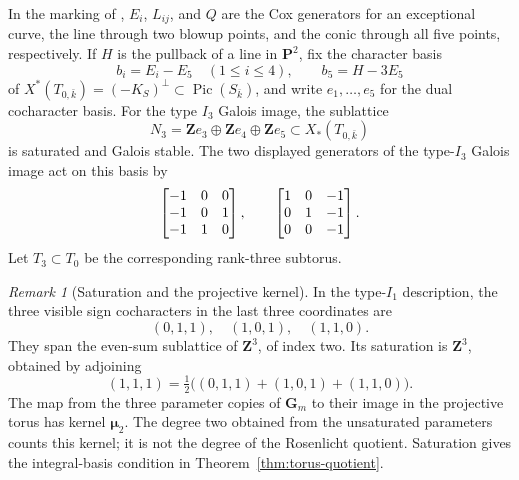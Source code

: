 \documentclass[11pt]{article}
\theoremstyle{remark}
\newtheorem{remark}[theorem]{Remark}
\newcommand{\Gm}{\mathbf G_m}
\newcommand{\PP}{\mathbf P}
\newcommand{\Z}{\mathbf Z}
\newcommand{\Pic}{\operatorname{Pic}}
\begin{document}
In the marking of \cite[Sections~3--4]{TZ}, \(E_i\), \(L_{ij}\), and \(Q\)
are the Cox generators for an exceptional curve, the line through two blowup
points, and the conic through all five points, respectively.  If \(H\)
is the pullback of a line in \(\PP^2\), fix the character basis
\[
 b_i=E_i-E_5\quad(1\leq i\leq4),\qquad b_5=H-3E_5
\]
of \(X^*(T_{0,\bar k})=(-K_S)^\perp\subset\Pic(S_{\bar k})\), and
write \(e_1,\ldots,e_5\) for the dual cocharacter basis. For the type
\(I_3\) Galois image, the sublattice
\begin{equation}
 N_3=\Z e_3\oplus\Z e_4\oplus\Z e_5\subset X_*(T_{0,\bar k})
 \label{eq:rank-three-lattice}
\end{equation}
is saturated and Galois stable.  The two displayed generators of the
type-\(I_3\) Galois image act on this basis by
\[
 \left[\begin{matrix}-1 & 0 & 0\\-1 & 0 & 1\\-1 & 1 & 0\end{matrix}\right],
 \qquad
 \left[\begin{matrix}1 & 0 & -1\\0 & 1 & -1\\0 & 0 & -1\end{matrix}\right].
\]
Let \(T_3\subset T_0\) be the corresponding rank-three subtorus.
\begin{remark}[Saturation and the projective kernel]
\label{rem:saturation}
%
In the type-\(I_1\) description, the three visible sign cocharacters in the
last three coordinates are
\[
 (0,1,1),\quad(1,0,1),\quad(1,1,0).
\]
They span the even-sum sublattice of \(\Z^3\), of index two.  Its saturation
is \(\Z^3\), obtained by adjoining
\[
 (1,1,1)=\tfrac12\bigl((0,1,1)+(1,0,1)+(1,1,0)\bigr).
\]
The map from the three parameter copies of \(\Gm\) to their image in the
projective torus has kernel \(\boldsymbol\mu_2\).  The degree two obtained
from the unsaturated parameters counts this kernel; it is not the degree of
the Rosenlicht quotient.  Saturation gives the integral-basis condition in
Theorem~\ref{thm:torus-quotient}.
\end{remark}
\end{document}
